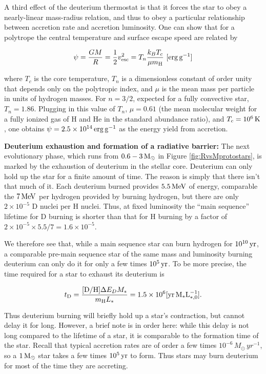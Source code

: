 \documentclass[a4paper,10pt]{article}
\begin{document}
{\noindent}A third effect of the deuterium thermostat is that it forces the star to obey a nearly-linear mass-radius relation, and thus to obey a particular relationship between accretion rate and accretion luminosity. One can show that for a polytrope the central temperature and surface escape speed are related by

\begin{align*}
    \psi = \frac{GM}{R} = \frac{1}{2} v_{\rm esc}^2 = T_n \frac{k_BT_c}{\mu m_{\rm H}} ~ [{\rm erg\,g^{-1}}]
\end{align*}

{\noindent}where $T_c$ is the core temperature, $T_n$ is a dimensionless constant of order unity that depends only on the polytropic index, and $\mu$ is the mean mass per particle in units of hydrogen masses. For $n=3/2$, expected for a fully convective star, $T_n=1.86$. Plugging in this value of $T_n$, $\mu=0.61$ (the mean molecular weight for a fully ionized gas of H and He in the standard abundance ratio), and $T_c=10^6\,{\rm K}$, one obtains $\psi=2.5\times10^{14}\,{\rm erg\,g^{-1}}$ as the energy yield from accretion.

{\noindent}\textbf{Deuterium exhaustion and formation of a radiative barrier:} The next evolutionary phase, which runs from $0.6-3\,{\rm M_\odot}$ in Figure \ref{fig:RvsMprotostars}, is marked by the exhaustion of deuterium in the stellar core. Deuterium can only hold up the star for a finite amount of time. The reason is simply that there isn't that much of it. Each deuterium burned provides $5.5\,{\rm MeV}$ of energy, comparable the $7\,{\rm MeV}$ per hydrogen provided by burning hydrogen, but there are only $2\times10^{-5}$ D nuclei per H nuclei. Thus, at fixed luminosity the ``main sequence'' lifetime for D burning is shorter than that for H burning by a factor of $2\times10^{-5}\times5.5/7 = 1.6\times10^{-5}$.

{\noindent}We therefore see that, while a main sequence star can burn hydrogen for $10^{10}\,{\rm yr}$, a comparable pre-main sequence star of the same mass and luminosity burning deuterium can only do it for only a few times $10^5\,{\rm yr}$. To be more precise, the time required for a star to exhaust its deuterium is

\begin{align*}
    t_{\rm D} = \frac{[{\rm D/H}]\Delta E_DM_*}{m_{\rm H}L_*} = 1.5\times10^6 [{\rm yr\,M_*L_{*,0}^{-1}}].
\end{align*}

{\noindent}Thus deuterium burning will briefly hold up a star's contraction, but cannot delay it for long. However, a brief note is in order here: while this delay is not long compared to the lifetime of a star, it is comparable to the formation time of the star. Recall that typical accretion rates are of order a few times $10^{-6}\,{M_\odot\,yr^{-1}}$, so a $1\,{\rm M_\odot}$ star takes a few times $10^5\,{\rm yr}$ to form. Thus stars may burn deuterium for most of the time they are accreting.
\end{document}
